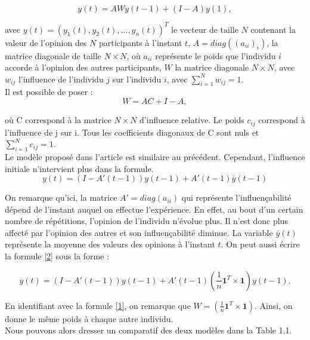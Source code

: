 \documentclass{scrreprt}
\begin{document}
\begin{multicols}{2}
\begin{equation}
\label{1}
y(t) =AWy(t-1)+(I-A)y(1), 
\end{equation}

avec $y(t)=(y_1(t), y_2(t), ... , y_n(t))^T$ le vecteur de taille $N$ contenant la valeur de l’opinion des $N$ participants à l’instant $t$, $A=diag((a_{ii})_i)$, la matrice diagonale de taille $N\times N$, où $a_{ii}$ représente le poids que l'individu $i$ accorde à l'opinion des autres participants, $W$ la matrice diagonale $N\times N$, avec $w_{ij}$ l’influence de l’individu $j$ sur l’individu $i$, avec $\sum_{i=1}^{N} w_{ij} = 1$. \\

 Il est possible de poser :\\
\begin{equation}
\label{WC}
 W=AC+I-A,
\end{equation}

où C correspond à la matrice $N \times N$ d'influence relative. Le poids $c_{ij}$ correspond à l'influence de j sur i. Tous les coefficients diagonaux de C sont nuls et $\sum_{i=1}^{N} c_{ij} = 1$. \\

Le modèle proposé dans l'article \cite{VMG} est similaire au précédent. Cependant, l’influence initiale n'intervient plus dans la formule.\\

\begin{equation}
\label{2}
y(t) =(I-A'(t-1))y(t-1)+A'(t-1)\bar{y}(t-1) 
\end{equation}

On remarque qu’ici, la matrice $A' = diag(a_{ii})$ qui représente l'influençabilité dépend de l’instant auquel on effectue l’expérience. En effet, au bout d'un certain nombre de répétitions, l'opinion de l'individu n'évolue plus. Il n'est donc plus affecté par l'opinion des autres et son influençabilité diminue. La variable $\bar{y}(t)$ représente la moyenne des valeurs des opinions à l’instant $t$. On peut aussi écrire la formule \eqref{2} sous la forme :

\begin{dmath}
\label{3}
y(t) = (I-A'(t-1))y(t-1) + A'(t-1)(\frac{1}{n} \textbf{1} ^T\times \textbf{1}) y(t-1).
\end{dmath}

En identifiant avec la formule \eqref{1}, on remarque que $W=(\frac{1}{n} \textbf{1} ^T\times \textbf{1})$. Ainsi, on donne le même poids à chaque autre individu.\\

Nous pouvons alors dresser un comparatif des deux modèles dans la Table 1.1.\\

\end{multicols}
\end{document}
